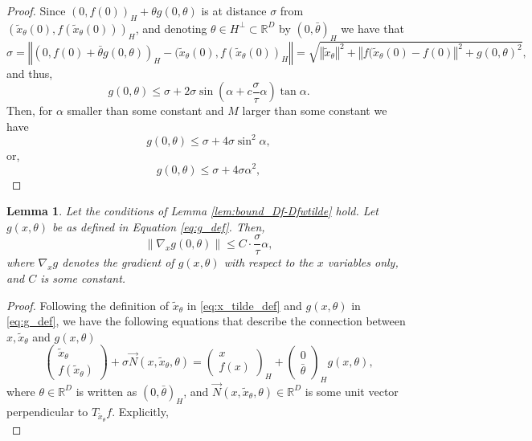 \documentclass[12pt]{article}
\newtheorem{Lemma}[Theorem]{Lemma}
\theoremstyle{remark}
\newcommand{\RR}{\mathbb{R}}
\newcommand{\norm}[1]{\left\Vert #1 \right\Vert}
\newcommand{\wtilde}[1]{\widetilde{#1}}
\begin{document}
\begin{appendices}
\begin{proof}
    Since $(0, f(0))_H + \theta g(0,\theta)$ is at distance  $\sigma$ from $(\wtilde{x}_\theta(0), f(\wtilde{x}_\theta(0)))_H$, and denoting $\theta\in H^\perp\subset \RR^D$ by $(0, \bar \theta)_H$ we have that
    \[
    \sigma  =
    \norm{(0, f(0) + \bar \theta g(0, \theta)  )_H -(\wtilde x_{\theta}(0), f(\wtilde x_\theta(0))_H}
    = \sqrt{\norm{\wtilde x_\theta}^2 + \norm{f(\wtilde x_\theta(0) - f(0)}^2 + g(0,\theta)^2 },\]
    and thus,
    \[
    g(0,\theta) \leq \sigma + 2\sigma \sin (\alpha + c\frac{\sigma}{\tau}\alpha) \tan \alpha
    .\]
    Then, for $\alpha$ smaller than some constant and $M$ larger than some constant we have 
    \[
    g(0,\theta) \leq \sigma + 4\sigma \sin^2 \alpha,
    \] 
    or,
    \[
    g(0,\theta) \leq \sigma + 4\sigma \alpha^2,
    \] 
\end{proof}
\begin{Lemma}\label{lem:bound_nablag}
Let the conditions of Lemma \ref{lem:bound_Df-Dfwtilde} hold.
Let $g(x, \theta)$ be as defined in Equation \eqref{eq:g_def}. Then, 
\[
\|\nabla_x{g}(0,\theta)\| \leq C \cdot \frac{\sigma}{\tau}\alpha 
,\]
where $\nabla_x{g}$ denotes the gradient of $g(x, \theta)$ with respect to the $x$ variables only, and $C$ is some constant.
\end{Lemma}
\begin{proof}
Following the definition of $\wtilde{x}_\theta$ in \eqref{eq:x_tilde_def} and $g(x,\theta)$ in \eqref{eq:g_def}, we have the following equations that describe the connection between $x, \wtilde{x}_\theta$ and $g(x,\theta)$
\begin{equation*}
\left(\begin{array}{c}
     \wtilde{x}_\theta \\
     f(\wtilde{x}_\theta) 
\end{array}\right)
+
\sigma \vec N(x,\wtilde{x}_\theta,\theta) = 
\left(\begin{array}{c}
     x \\
     f(x) 
\end{array}\right)_H
+ 
\left(\begin{array}{c}
     0 \\
     \bar \theta
\end{array}\right)_H g(x,\theta)
,\end{equation*}
where $\theta\in \RR^D$ is written as $(0, \bar \theta)_H$, and $ \vec N(x,\wtilde{x}_\theta,\theta)\in \RR^D$ is some unit vector perpendicular to $T_{\wtilde{x}_\theta}f$.
Explicitly, 
\begin{equation}\label{eq:c_2}

\end{equation}
\end{proof}
\end{appendices}
\end{document}
